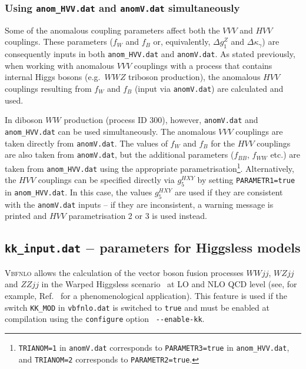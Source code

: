 \documentclass[english,12pt]{article}
\begin{document}
\subsubsection{Using {\tt anom\_HVV.dat} and {\tt anomV.dat} simultaneously}
\label{sec:HVVandVVV}

Some of the anomalous coupling parameters affect both the $VVV$ and $HVV$ couplings.  
These parameters ($f_{W}$ and $f_{B}$ or, equivalently, $\Delta g_{1}^{Z}$ and 
$\Delta \kappa_{\gamma}$) are consequently inputs in both {\tt anom\_HVV.dat} 
and {\tt anomV.dat}.  As stated previously, when working with anomalous $VVV$ 
couplings with a process that contains internal Higgs bosons (e.g.\ $WWZ$ triboson production), 
the anomalous $HVV$ couplings resulting from $f_{W}$ and $f_{B}$ (input 
via {\tt anomV.dat}) are calculated and used.

In diboson $WW$ production (process ID 300), however, {\tt anomV.dat} and {\tt anom\_HVV.dat} 
can be used simultaneously.  The anomalous $VVV$ couplings are taken directly from {\tt anomV.dat}.  
The values of $f_{W}$ and $f_{B}$ for the $HVV$ couplings are also taken from {\tt anomV.dat}, 
but the additional parameters ($f_{BB}$, $f_{WW}$ etc.) are taken from {\tt anom\_HVV.dat} 
using the appropriate parametrisation\footnote{{\tt TRIANOM=1} in {\tt anomV.dat} corresponds 
to {\tt PARAMETR3=true} in {\tt anom\_HVV.dat}, and {\tt TRIANOM=2} corresponds to {\tt PARAMETR2=true}.}. 
 Alternatively, the $HVV$ couplings can be specified directly via $g_{5}^{HXY}$ by setting 
{\tt PARAMETR1=true} in {\tt anom\_HVV.dat}.  In this case, the values $g_{5}^{HXY}$ are used if 
they are consistent with the {\tt anomV.dat} inputs -- if they are inconsistent, a warning message 
is printed and $HVV$ parametrisation 2 or 3 is used instead.




\subsection{{\tt kk\_input.dat} $-$ parameters for Higgsless models}

\textsc{Vbfnlo} allows the calculation of the vector boson fusion processes
$WWjj$, $WZjj$ and $ZZjj$ in the Warped Higgsless scenario~\cite{Csaki:2003zu,
Englert:2008wp} at LO and NLO QCD level (see, for example,
Ref.~\cite{Englert:2008tn} for a phenomenological application). This feature is
used if the switch {\tt KK\_MOD} in {\tt vbfnlo.dat} is switched to {\tt true}
and must be enabled at compilation using the {\tt configure} option {\tt
-{}-enable-kk}.
\end{document}
